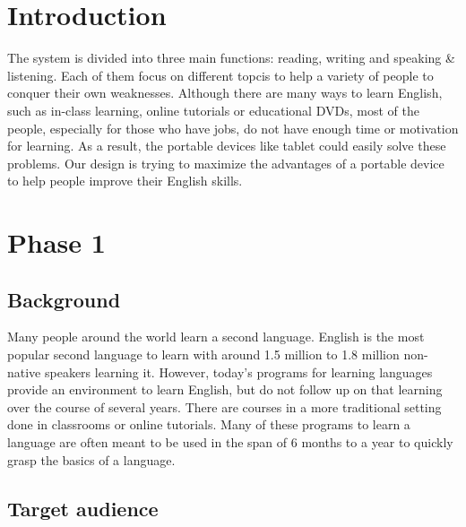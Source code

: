 \documentclass{sigchi}
\begin{document}


\section{Introduction}

The system is divided into  three main functions: reading, writing and speaking \& listening. Each 
of them  focus on different topcis to help a variety of people to conquer their own weaknesses. 
Although there are many ways to learn English, such as in-class learning, online tutorials or 
educational DVDs, most of the people, especially for those who have jobs, do not have enough time 
or motivation for learning. As a result, the portable devices like tablet could easily solve these 
problems. Our design is trying to maximize the advantages of a portable device to help people improve 
their English skills.

\section{Phase 1}

\subsection{Background}

Many people around the world learn a second language. English is the most 
popular second language to learn with around 1.5 million to 1.8 million 
non-native speakers learning it. However, today’s programs for learning 
languages provide an environment to learn English, but do not follow up on that 
learning over the course of several years. There are courses in a more 
traditional setting done in classrooms or online tutorials. Many of these 
programs to learn a language are often meant to be used in the span of 6 months 
to a year to quickly grasp the basics of a language.

\subsection{Target audience}
\end{document}

